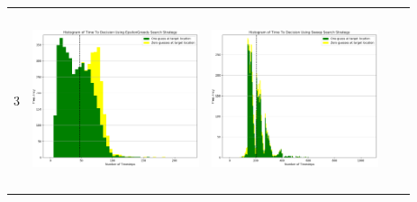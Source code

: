 \begin{landscape}
\begin{table}[h!]
\begin{tabular}{ | c | c | c | c | c |}
    3 & 
    \begin{minipage}[c][58mm][c]{49mm}
      \includegraphics[width=49mm, height=52mm]{Chapters/MultiAgentTargetDetection/Figs/Histograms/MultipleAgent/3/SingleAgentSingleSource3EpsilonGreedyHistogram.png}
    \end{minipage}
    &
    \begin{minipage}[c][58mm][c]{49mm}
      \includegraphics[width=49mm, height=52mm]{Chapters/MultiAgentTargetDetection/Figs/Histograms/MultipleAgent/3/SingleAgentSingleSource3SweepHistogram.png}


\end{minipage}
\end{tabular}
\end{table}
\end{landscape}
